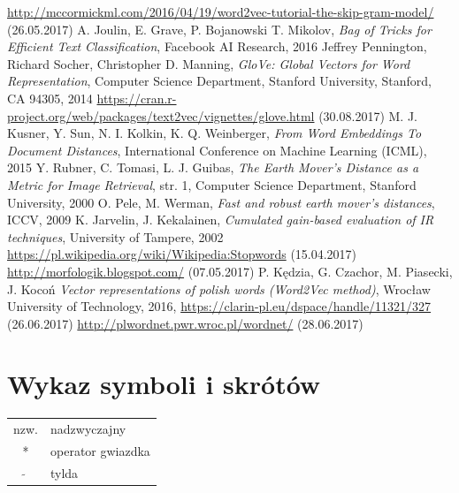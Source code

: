 \documentclass[pl]{minipw} %
\begin{document}
\begin{thebibliography}{30}
	\url{http://mccormickml.com/2016/04/19/word2vec-tutorial-the-skip-gram-model/}
	(26.05.2017)
	A. Joulin, E. Grave, P. Bojanowski T. Mikolov,
	\emph{Bag of Tricks for Efficient Text Classification},
	Facebook AI Research,
	2016
	Jeffrey Pennington, Richard Socher, Christopher D. Manning,
	\emph{GloVe: Global Vectors for Word Representation},
	Computer Science Department, Stanford University, Stanford, CA 94305,
	2014
	\url{https://cran.r-project.org/web/packages/text2vec/vignettes/glove.html}
	(30.08.2017)
	M. J. Kusner, Y. Sun, N. I. Kolkin, K. Q. Weinberger,
	\emph{From Word Embeddings To Document Distances},
	International Conference on Machine Learning (ICML),
	2015	
	Y. Rubner, C. Tomasi, L. J. Guibas,
	\emph{The Earth Mover's Distance as a Metric for Image Retrieval},
	str. 1,
	Computer Science Department, Stanford University,
	2000	
	O. Pele, M. Werman,
	\emph{Fast and robust earth mover's distances},
	ICCV,
	2009
	K. Jarvelin, J. Kekalainen,
	\emph{Cumulated gain-based evaluation of IR techniques},
	University of Tampere,
	2002
	\url{https://pl.wikipedia.org/wiki/Wikipedia:Stopwords}
	(15.04.2017)
	\url{http://morfologik.blogspot.com/}
	(07.05.2017)
	P. Kędzia, G. Czachor, M. Piasecki, J. Kocoń
	\emph{Vector representations of polish words (Word2Vec method)},
	Wrocław University of Technology,
	2016,
	\url{https://clarin-pl.eu/dspace/handle/11321/327}
	(26.06.2017)
	\url{http://plwordnet.pwr.wroc.pl/wordnet/}
	(28.06.2017)
	
\end{thebibliography}



\chapter*{Wykaz symboli i skrótów}

\begin{tabular}{cl}
nzw. & nadzwyczajny \\
* & operator gwiazdka \\
$\widetilde{}$ & tylda
\end{tabular}


\listoffigures


\renewcommand{\listtablename}{Spis tabel}
\listoftables
\end{document}
